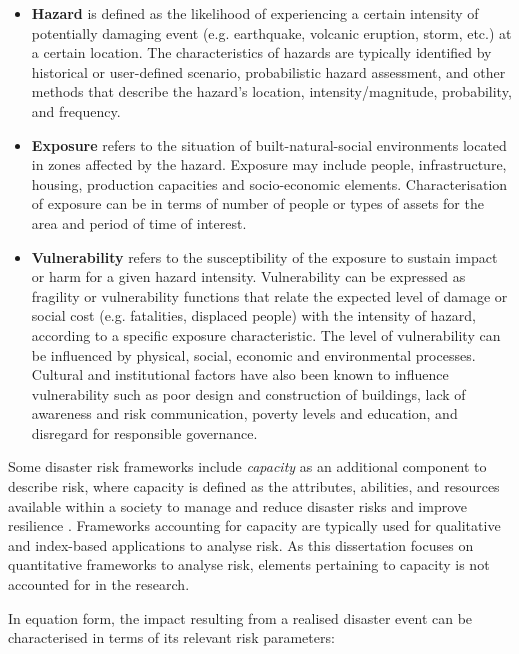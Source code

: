\begin{itemize}
    \item \textbf{Hazard} is defined as the likelihood of experiencing a certain intensity of potentially damaging event (e.g. earthquake, volcanic eruption, storm, etc.) at a certain location. The characteristics of hazards are typically identified by historical or user-defined scenario, probabilistic hazard assessment, and other methods that describe the hazard's location, intensity/magnitude, probability, and frequency.

    \item \textbf{Exposure} refers to the situation of built-natural-social environments located in zones affected by the hazard. Exposure may include people, infrastructure, housing, production capacities and socio-economic elements. Characterisation of exposure can be in terms of number of people or types of assets for the area and period of time of interest.

    \item \textbf{Vulnerability} refers to the susceptibility of the exposure to sustain impact or harm for a given hazard intensity. Vulnerability can be expressed as fragility or vulnerability functions that relate the expected level of damage or social cost (e.g. fatalities, displaced people) with the intensity of hazard, according to a specific exposure characteristic. The level of vulnerability can be influenced by physical, social, economic and environmental processes. Cultural and institutional factors have also been known to influence vulnerability such as poor design and construction of buildings, lack of awareness and risk communication, poverty levels and education, and disregard for responsible governance.
    
\end{itemize}

Some disaster risk frameworks include \textit{capacity} as an additional component to describe risk, where capacity is defined as the attributes, abilities, and resources available within a society to manage and reduce disaster risks and improve resilience \citet{assembly2016report}. Frameworks accounting for capacity are typically used for qualitative and index-based applications to analyse risk. As this dissertation focuses on quantitative frameworks to analyse risk, elements pertaining to capacity is not accounted for in the research.

In equation form, the impact resulting from a realised disaster event can be characterised in terms of its relevant risk parameters:

